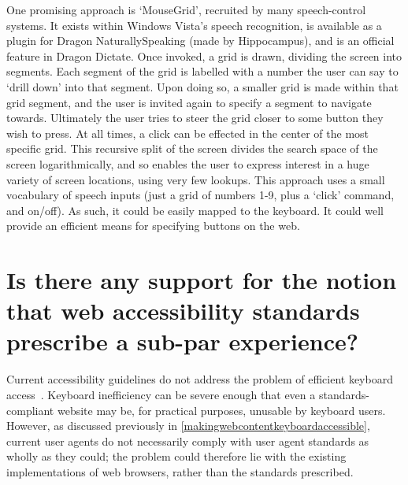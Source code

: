 \documentclass[a4paper, 12pt]{report}
\begin{document}
One promising approach is `MouseGrid', recruited by many speech-control systems. It exists within Windows Vista's speech recognition, is available as a plugin for Dragon NaturallySpeaking (made by Hippocampus), and is an official feature in Dragon Dictate. Once invoked, a grid is drawn, dividing the screen into segments. Each segment of the grid is labelled with a number the user can say to `drill down' into that segment. Upon doing so, a smaller grid is made within that grid segment, and the user is invited again to specify a segment to navigate towards. Ultimately the user tries to steer the grid closer to some button they wish to press.
At all times, a click can be effected in the center of the most specific grid. This recursive split of the screen divides the search space of the screen logarithmically, and so enables the user to express interest in a huge variety of screen locations, using very few lookups.
This approach uses a small vocabulary of speech inputs (just a grid of numbers 1-9, plus a `click' command, and on/off). As such, it could be easily mapped to the keyboard. It could well provide an efficient means for specifying buttons on the web.
\section{Is there any support for the notion that web accessibility standards prescribe a sub-par experience?}
\label{subparstandards}
Current accessibility guidelines do not address the problem of efficient keyboard access~\cite{schrepp2006efficiency}. Keyboard inefficiency can be severe enough that even a standards-compliant website may be, for practical purposes, unusable by keyboard users\cite{schrepp2006efficiency,coyne2001beyond,powlik2002accessibility}. However, as discussed previously in \cref{makingwebcontentkeyboardaccessible}, current user agents do not necessarily comply with user agent standards as wholly as they could; the problem could therefore lie with the existing implementations of web browsers, rather than the standards prescribed.
\end{document}
